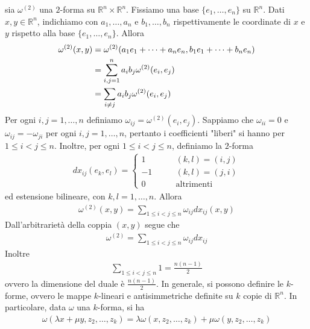 \documentclass[twoside, 11pt]{amsbook}
\makeatletter
\newcommand{\0}{{(0)}}
\newcommand{\3}{{(3)}}
\theoremstyle{colonplain}
\theoremstyle{colondefinition}
\theoremstyle{colonremark}
\numberwithin{equation}{chapter}
\renewcommand{\proofname}{Dimostrazione}
\renewenvironment{proof}[1][\proofname]{\par
  \pushQED{\qed}%
  \normalfont \topsep6\p@\@plus6\p@\relax
  \trivlist
  \item[\hskip\labelsep\bfseries #1:]\ignorespaces
}{%
  \popQED\endtrivlist\@endpefalse
}
\makeatother
\begin{document}
\begin{proof} sia $\omega^{(2)}$ una $2$-forma su $\mathbb{R}^n \times \mathbb{R}^n$. Fissiamo una base $\{e_1, \dots, e_n\}$ su $\mathbb{R}^n$. Dati $x, y \in \mathbb{R}^n$, indichiamo con $a_1, \dots, a_n$ e $b_1, \dots, b_n$ rispettivamente le coordinate di $x$ e $y$ rispetto alla base $\{e_1, \dots, e_n\}$. Allora 
\begin{align}
    \omega^{(2)}(x, y) &= \omega^{(2)}(a_1e_1 + \dots + a_ne_n, b_1e_1 + \dots + b_ne_n) \notag \\
    &= \sum_{i,j = 1}^n a_ib_j\omega^{(2)}(e_i, e_j) \notag \\
    &= \sum_{i \neq j} a_ib_j\omega^{(2)}(e_i, e_j) \notag
\end{align}
Per ogni $i,j = 1, \dots, n$ definiamo $\omega_{ij} = \omega^{(2)}(e_i, e_j)$. Sappiamo che $\omega_{ii} = 0$ e $\omega_{ij} = -\omega_{ji}$ per ogni $i, j = 1, \dots, n$, pertanto i coefficienti "liberi" si hanno per $1 \leq i < j \leq n$. Inoltre, per ogni $1 \leq i < j \leq n$, definiamo la $2$-forma 
\begin{align}
    dx_{ij}(e_k, e_l) = \begin{cases}
        1 \qquad &(k, l) = (i, j) \\
        -1 \qquad &(k, l) = (j, i) \\
        0 \qquad &\text{altrimenti}
    \end{cases}
\end{align}
ed estensione bilineare, con $k, l = 1, \dots, n$. Allora 
\begin{align}
    \omega^{(2)}(x, y) = \sum_{1 \leq i < j \leq n}\omega_{ij}dx_{ij}(x, y)
\end{align}
Dall'arbitrarietà della coppia $(x, y)$ segue che 
\begin{align}
    \omega^{(2)} = \sum_{1 \leq i < j \leq n} \omega_{ij}dx_{ij}
\end{align}
Inoltre 
\begin{align}
    \sum_{1 \leq i < j \leq n} 1 = \frac{n(n - 1)}{2}
\end{align}
ovvero la dimensione del duale è $\frac{n(n - 1)}{2}$.
\end{proof}
In generale, si possono definire le $k$-forme, ovvero le mappe $k$-lineari e antisimmetriche definite su $k$ copie di $\mathbb{R}^n$. In particolare, data $\omega$ una $k$-forma, si ha 
\begin{align}
    \omega(\lambda x + \mu y, z_2, \dots, z_k) = \lambda\omega(x, z_2, \dots, z_k) + \mu\omega(y, z_2, \dots, z_k)
\end{align}
\end{document}
